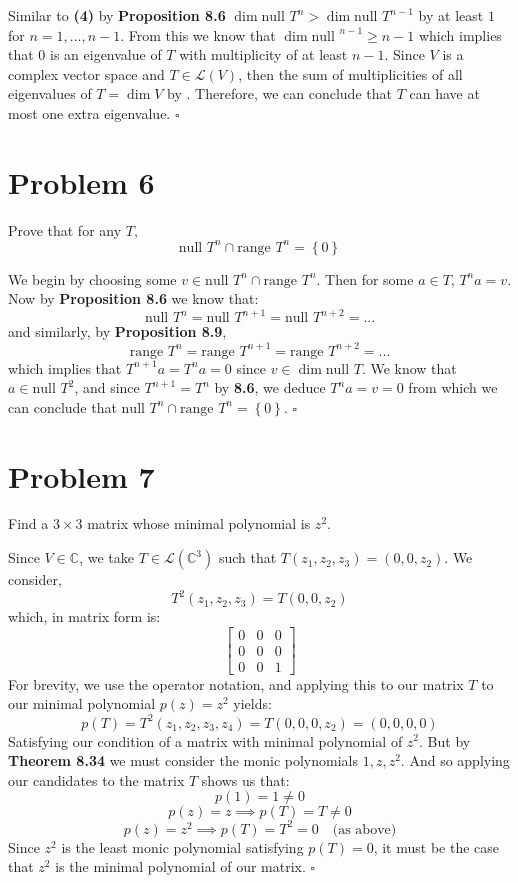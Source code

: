 \documentclass[12pt]{article}
\newcommand{\C}{\mathbb{C}}
\newcommand{\set}[1]{\left\{ #1\right\}}
\newenvironment{proof}{\noindent{\bf Proof.}}{\hfill $\square$\medskip}
\begin{document}
\begin{proof}
    Similar to \textbf{(4)} by \textbf{Proposition 8.6} $\dim\text{null }T^{n}>\dim\text{null }T^{n-1}$ by at least $1$ for $n=1,...,n-1$. From this we know that $\dim\text{null }^{n-1}\geq n-1$ which implies that $0$ is an eigenvalue of $T$ with multiplicity of at least $n-1$. Since $V$ is a complex vector space and $T\in\mathcal{L}(V)$, then the sum of multiplicities of all eigenvalues of $T=\dim V$ by . Therefore, we can conclude that $T$ can have at most one extra eigenvalue.
\end{proof}


\newpage
\section{Problem 6}
Prove that for any $T$,
$$\text{null }T^{n}\cap\text{range }T^{n}=\set{0}$$

\begin{proof}
    We begin by choosing some $v\in\text{null }T^{n}\cap\text{range }T^{n}$. Then for some $a\in T$, $T^{n}a=v$. Now by \textbf{Proposition 8.6} we know that:
    $$\text{null }T^{n}=\text{null }T^{n+1}=\text{null }T^{n+2}=...$$
    and similarly, by \textbf{Proposition 8.9},
    $$\text{range }T^{n}=\text{range }T^{n+1}=\text{range }T^{n+2}=...$$
    which implies that $T^{n+1}a=T^{n}a=0$ since $v\in\dim\text{null }T$. We know that $a\in\text{null }T^{2}$, and since $T^{n+1}=T^{n}$ by \textbf{8.6}, we deduce $T^{n}a=v=0$ from which we can conclude that $\text{null }T^{n}\cap\text{range }T^{n}=\set{0}$.
\end{proof}


\newpage
\section{Problem 7}
Find a $3\times3$ matrix whose minimal polynomial is $z^{2}$.

\begin{proof}
    Since $V\in\C$, we take $T\in\mathcal{L}(\C^{3})$ such that $T(z_{1},z_{2},z_{3})=(0,0,z_{2})$. We consider,
    $$T^{2}(z_{1},z_{2},z_{3})=T(0,0,z_{2})$$
    which, in matrix form is:
    $$
        \begin{bmatrix}
            0 & 0 & 0 \\
            0 & 0 & 0 \\
            0 & 0 & 1
        \end{bmatrix}
    $$
    For brevity, we use the operator notation, and applying this to our matrix $T$ to our minimal polynomial $p(z)=z^{2}$ yields:
    $$p(T)=T^{2}(z_{1},z_{2},z_{3},z_{4})=T(0,0,0,z_{2})=(0,0,0,0)$$
    Satisfying our condition of a matrix with minimal polynomial of $z^{2}$. But by \textbf{Theorem 8.34} we must consider the monic polynomials $1, z, z^{2}$. And so applying our candidates to the matrix $T$ shows us that:
    $$p(1)=1\neq0$$
    $$p(z)=z\implies p(T)=T\neq0$$
    $$p(z)=z^{2}\implies p(T)=T^{2}=0\quad\text{(as above)}$$
    Since $z^{2}$ is the least monic polynomial satisfying $p(T)=0$, it must be the case that $z^{2}$ is the minimal polynomial of our matrix.
\end{proof}
\end{document}
